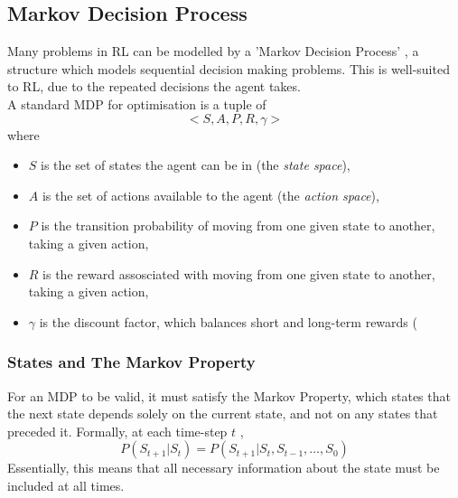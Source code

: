 \subsection{Markov Decision Process}
Many problems in RL can be modelled by a 'Markov Decision Process' \cite{bellman1957markovian}, a structure which models sequential decision making problems. This is well-suited to RL, due to the repeated decisions the agent takes.\\ A standard MDP for optimisation is a tuple of
\[ <S, A, P, R, \gamma>\]
where
\begin{itemize}
    \item $S$ is the set of states the agent can be in (the \textit{state space}),
    \item $A$ is the set of actions available to the agent (the \textit{action space}),
    \item $P$ is the transition probability of moving from one given state to another, taking a given action,
    \item $R$ is the reward assosciated with moving from one given state to another, taking a given action,
    \item $\gamma$ is the discount factor, which balances short and long-term rewards (
\end{itemize}
\subsubsection{States and The Markov Property}
For an MDP to be valid, it must satisfy the Markov Property, which states that the next state depends solely on the current state, and not on any states that preceded it. Formally, at each time-step $t$ , $$P(S_{t+1} | S_t) = P(S_{t+1} | S_t, S_{t-1}, \ldots, S_0)$$ Essentially, this means that all necessary information about the state must be included at all times.
